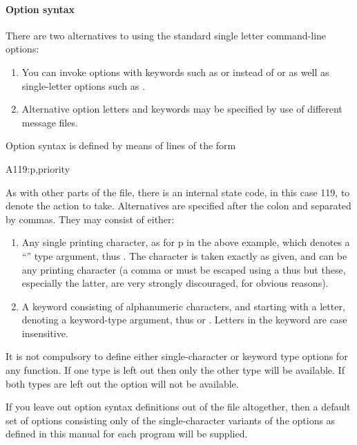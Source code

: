 \paragraph{Option syntax}
There are two alternatives to using the standard single letter command-line options:

\begin{enumerate}
\item You can invoke options with keywords such as  or  instead of or as well as
single-letter options such as .
\item Alternative option letters and keywords may be specified by use of different message files.
\end{enumerate}
Option syntax is defined by means of lines of the form

\begin{expara}

A119:p,priority

\end{expara}

As with other parts of the file, there is an internal state code, in this case 119, to denote the action to take. Alternatives are specified
after the colon and separated by commas. They may consist of either:

\begin{enumerate}
\item Any single printing character, as for p in the above example, which denotes a ``\exampletext{{}-}'' type argument,
thus . The character is taken exactly as given, and can be any printing character
(a comma or \exampletext{{\textbackslash}} must be escaped using a \exampletext{{\textbackslash}} thus \exampletext{{\textbackslash},}
\exampletext{{\textbackslash}{\textbackslash}} but these, especially the latter, are very strongly discouraged, for obvious reasons).
\item A keyword consisting of alphanumeric characters, \exampletext{{}-} and \exampletext{\_} starting with a letter, denoting a keyword-type argument, thus
 or . Letters in the keyword are case insensitive.
\end{enumerate}
It is not compulsory to define either single-character or keyword type options for any function. If one type is left out then only the other
type will be available. If both types are left out the option will not be available.

If you leave out option syntax definitions out of the file altogether, then a default set of options consisting only of the single-character
variants of the options as defined in this manual for each program will be supplied.

